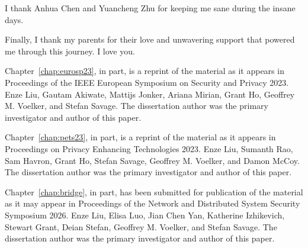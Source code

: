 \begin{acknowledgements}
I thank Anhua Chen and Yuancheng Zhu for keeping me sane during the insane days.

Finally, I thank my parents for their love and unwavering support that powered me through this journey. I love you.

Chapter~\ref{chap:eurosp23}, in part, is a reprint of the material as it appears in Proceedings of the IEEE European Symposium on Security and Privacy 2023. Enze Liu, Gautam Akiwate, Mattijs Jonker, Ariana Mirian, Grant Ho, Geoffrey M. Voelker, and Stefan Savage. The dissertation author was the primary investigator and author of this paper.

Chapter~\ref{chap:pets23}, in part, is a reprint of the material as it appears in Proceedings on Privacy Enhancing Technologies 2023. Enze Liu, Sumanth Rao, Sam Havron, Grant Ho, Stefan Savage, Geoffrey M. Voelker, and
Damon McCoy. The dissertation author was the primary investigator and author of this paper.

Chapter~\ref{chap:bridge}, in part, has been submitted for publication of the material as it may appear in Proceedings of the Network and Distributed System Security Symposium 2026. Enze Liu, Elisa Luo, Jian Chen Yan, Katherine Izhikevich, Stewart Grant, Deian Stefan, Geoffrey M. Voelker, and Stefan Savage. The dissertation author was the primary investigator and author of this paper.




\end{acknowledgements}
